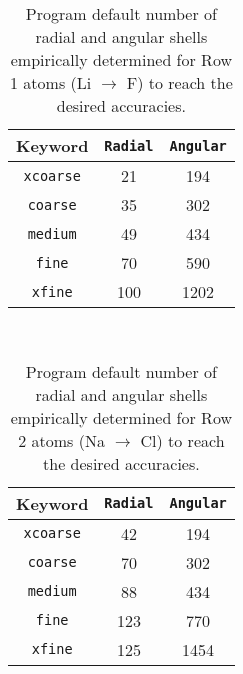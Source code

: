 \begin{table}[h]
\begin{center}
\caption{Program default number of radial and angular shells empirically determined for Row 1 atoms
  (Li $\rightarrow$ F) to reach the desired accuracies.}

\vspace{.2in}

  \begin{tabular}[right]{|c|c|c|} \hline
Keyword & {\tt Radial} & {\tt Angular}  \\ \hline
{\tt xcoarse} & 21 & 194  \\ \hline
{\tt coarse}  & 35 & 302  \\ \hline
{\tt medium}  & 49 & 434  \\ \hline
{\tt fine}    & 70 & 590  \\ \hline
{\tt xfine}   &100 &1202  \\ \hline
  \end{tabular} \\
\end{center}
\end{table}

\begin{table}[h]
\begin{center}
\caption{Program default number of radial and angular shells empirically determined for Row 2 atoms
  (Na $\rightarrow$ Cl) to reach the desired accuracies.}

\vspace{.2in}

  \begin{tabular}[right]{|c|c|c|} \hline
Keyword & {\tt Radial} & {\tt Angular} \\ \hline
{\tt xcoarse} & 42 & 194  \\ \hline
{\tt coarse}  & 70 & 302  \\ \hline
{\tt medium}  & 88 & 434  \\ \hline
{\tt fine}    &123 & 770  \\ \hline
{\tt xfine}   &125 &1454  \\ \hline
  \end{tabular} \\
\end{center}
\end{table}


